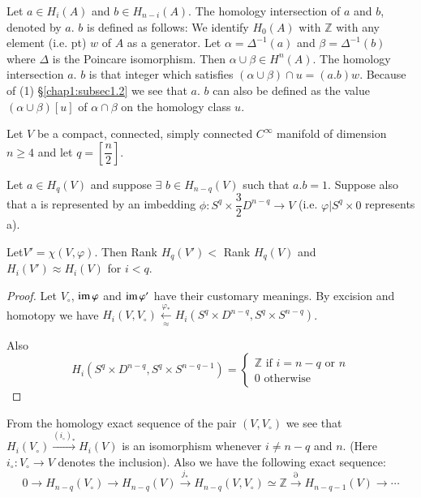 \setcounter{definition}{5}
\begin{definition} %
Let $a \in H_i (A)$ and $b \in H_{n-i} (A)$. The homology
intersection of $a$ and $b$, denoted by $a$. $b$ is defined as
follows: We identify $H_0 (A)$ with $\mathbb{Z}$ with any element
(i.e. pt) $w$ of $A$ as a generator. Let $\alpha = \Delta^{-1}(a)$ and
$\beta = \Delta^{-1}(b)$ where $\Delta$ is the Poincare
isomorphism. Then $\alpha \cup \beta \in H^n (A)$. The homology
intersection $a$. $b$ is that integer which satisfies $(\alpha \cup
\beta )\cap u = (a. b)w$. Because of (1) \S \ref{chap1:subsec1.2} we see that $a$. $b$
can also be defined as the value $(\alpha \cup \beta ) [u]$ of $\alpha
\cap \beta$ on the homology class $u$.  

Let $V$ be a compact, connected, simply connected $C^\infty$ manifold
of dimension $n \geq 4$ and let $q = [\dfrac{n}{2}]$. 
\end{definition}

\setcounter{lemma}{6}
\begin{lemma}\label{chap1:lem4.7}%
Let $a \in H_q (V)$ and suppose $\exists$ $b \in H_{n-q} (V)$
such that $a . b = 1$. Suppose also that a is represented by an
imbedding $\phi: S^q \times \dfrac{3}{2} D^{n-q} \to V$
(i.e. $\varphi | S^q \times 0$ represents a).  

Let\pageoriginale $V' = \chi (V, \varphi)$. Then Rank $H_q (V') <$
Rank $H_q (V)$ and $H_i (V') \approx H_i (V)$ for $i < q$.   
\end{lemma}

\begin{proof}
Let $V_\circ$, $\operatorname{im} \varphi$ and $\operatorname{im} \varphi'$ have their customary
meanings. By excision and homotopy we have $H_i (V, V_\circ)
\xleftarrow[\approx] {\varphi_*} H_i (S^q \times D^{n-q}, S^q \times
S^{n-q})$. 

Also
\begin{equation*}
H_i (S^q \times D^{n-q}, S^q \times S^{n-q-1})=
\begin{cases}
\mathbb{Z} \text{ if } i = n-q \text{ or } n\\
0 \text{ otherwise }
\end{cases}
\end{equation*}
\end{proof}


From the homology exact sequence of the pair $(V, V_\circ)$ we see that
$H_i (V_\circ) \xrightarrow{(i_\circ)_*} H_i (V)$ is an isomorphism whenever
$i \neq n - q$ and $n$. (Here $i_\circ: V_\circ \to V$ denotes the
inclusion). Also we have the following exact sequence:   
$$
0 \to H_{n-q} (V_\circ) \to H_{n-q } (V) \xrightarrow{j_*} H_{n-q} (V, 
V_\circ) \simeq \mathbb{Z} \xrightarrow{\partial} H_{n-q-1} (V) \to \cdots 
$$

